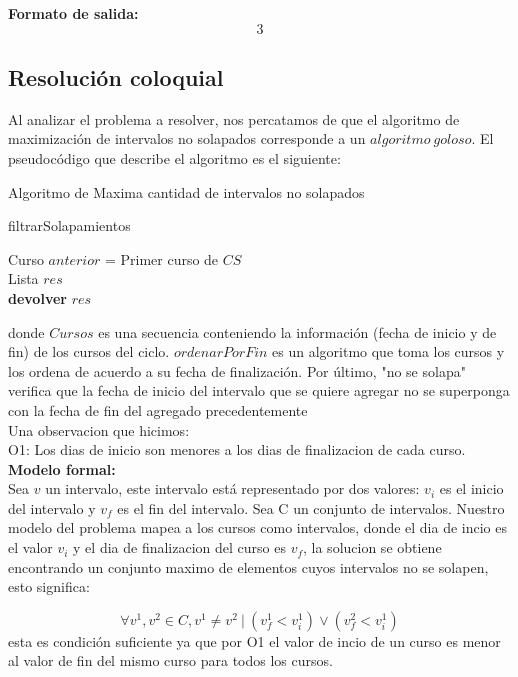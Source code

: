 \textbf{Formato de salida:} $$3$$

\subsection{Resolución coloquial}
Al analizar el problema a resolver, nos percatamos de que el algoritmo de maximización de intervalos no solapados corresponde a un $algoritmo\ goloso$. El pseudocódigo que describe el algoritmo es el siguiente:\newline


\begin{algorithm}[H]
	\SetAlgoLined
	\caption{Algoritmo de Maxima cantidad de intervalos no solapados}
\end{algorithm}

\begin{algorithm}[H]
	\SetAlgoLined
	\caption{filtrarSolapamientos}
	Curso $anterior$ = Primer curso de $CS$\\
	Lista $res$\\
	\textbf{devolver} $res$\\	
\end{algorithm}

donde $Cursos$ es una secuencia conteniendo la información (fecha de inicio y de fin) de los cursos del ciclo. $ordenarPorFin$ es un algoritmo que toma los cursos y los ordena de acuerdo a su fecha de finalización. Por último, "no se solapa" verifica que la fecha de inicio del intervalo que se quiere agregar no se superponga con la fecha de fin del agregado precedentemente\\
Una observacion que hicimos:\\
O1: Los dias de inicio son menores a los dias de finalizacion de cada curso.\\

\textbf{Modelo formal:}\\
Sea $v$ un intervalo, este intervalo está representado por dos valores: $v_{i}$ es el inicio del intervalo y $v_{f}$ es el fin del intervalo. Sea C un conjunto de intervalos. Nuestro modelo del problema mapea a los cursos como intervalos, donde el dia de incio es el valor $v_{i}$ y el dia de finalizacion del curso es $v_{f}$, la solucion se obtiene encontrando un conjunto maximo de elementos cuyos intervalos no se solapen, esto significa: 
\par{$$\forall v^{1}, v^{2} \in C, v^{1} \neq v^{2}\ | \ (v^{1}_{f} < v^{1}_{i}) \vee (v^{2}_{f} < v^{1}_{i})$$} 
esta es condición suficiente ya que por O1 el valor de incio de un curso es menor al valor de fin del mismo curso para todos los cursos.

